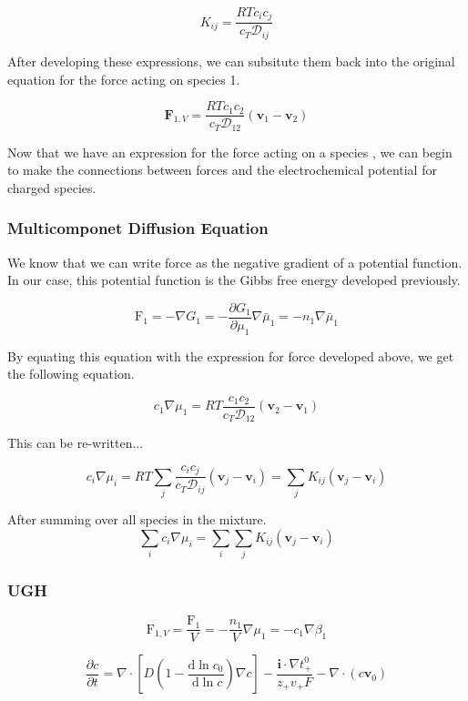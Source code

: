 \documentclass[lettersize,journal]{IEEEtran}
\begin{document}
\[
K_{i j}=\frac{R T c_{i} c_{j}}{c_{T} \mathscr{D}_{i j}}
\]

After developing these expressions, we can subsitute them back into the original equation for the force acting on species 1.

\[
  \mathbf{F}_{1, V}=\frac{R T c_{1} c_{2}}{c_{T} \mathscr{D}_{12}}\left(\mathbf{v}_{1}-\mathbf{v}_{2}\right)
\]


Now that we have an expression for the force acting on a species , we can begin to make the connections between forces and the electrochemical potential for charged species. \\


\subsubsection{Multicomponet Diffusion Equation}

We know that we can write force as the negative gradient of a potential function. In our case, this potential function is the Gibbs free energy developed previously.

\[
\mathrm{F}_{1}=-\nabla G_{1}=-\frac{\partial G_{1}}{\partial \mu_{1}} \nabla \bar{\mu}_{1}=-n_{1} \nabla \bar{\mu}_{1}
\]


By equating this equation with the expression for force developed above, we get the following equation.

\[
c_{1} \nabla \mu_{1}=R T \frac{c_{1} c_{2}}{c_{T} \mathscr{D}_{12}}\left(\mathbf{v}_{2}-\mathbf{v}_{1}\right)
\]


This can be re-written...

\[
c_{i} \nabla \mu_{i}=R T \sum_{j} \frac{c_{i} c_{j}}{c_{T} \mathscr{D}_{i j}}\left(\mathbf{v}_{j}-\mathbf{v}_{i}\right)=\sum_{j} K_{i j}\left(\mathbf{v}_{j}-\mathbf{v}_{i}\right)
\]

After summing over all species in the mixture.
\[
  \sum_{i} c_{i} \nabla \mu_{i}=\sum_{i} \sum_{j} K_{i j}\left(\mathbf{v}_{j}-\mathbf{v}_{i}\right)
\]


\subsubsection{UGH}

\[
\mathrm{F}_{1, V}=\frac{\mathrm{F}_{1}}{V}=-\frac{n_{1}}{V} \nabla \mu_{1}=-c_{1} \nabla \beta_{1}
\]

\[
\frac{\partial c}{\partial t}=\nabla \cdot\left[D\left(1-\frac{\mathrm{d} \ln c_{0}}{\mathrm{~d} \ln c}\right) \nabla c\right]-\frac{\mathbf{i} \cdot \nabla t_{+}^{0}}{z_{+} v_{+} F}-\nabla \cdot\left(c \mathbf{v}_{0}\right)
\]
\end{document}
